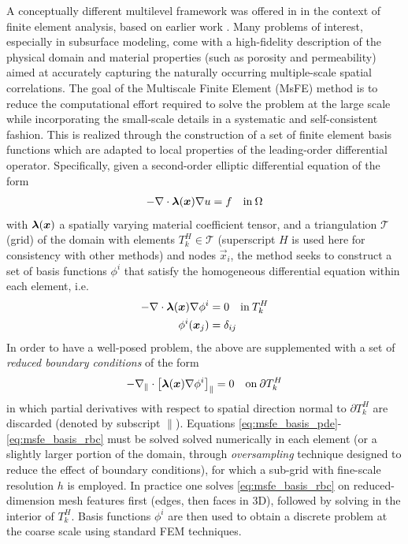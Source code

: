 A conceptually different multilevel framework was offered in \cite{Hou1997} in the context of finite element analysis, based on earlier work \cite{Babuska1983,Babuska1994}.   Many problems of interest, especially in subsurface modeling, come with a high-fidelity description of the physical domain and material properties (such as porosity and permeability) aimed at accurately capturing the naturally occurring multiple-scale spatial correlations.   The goal of the Multiscale Finite Element (MsFE) method is to reduce the computational effort required to solve the problem at the large scale while incorporating the small-scale details in a systematic and self-consistent fashion.   This is realized through the construction of a set of finite element basis functions which are adapted to local properties of the leading-order differential operator.   Specifically, given a second-order elliptic differential equation of the form
\begin{align}
    - \nabla \cdot \bm{\lambda}(\bm{x}) \nabla u = f \quad\text{in}\:\Omega
\end{align}
with $\bm{\lambda}(\bm{x})$ a spatially varying material coefficient tensor, and a triangulation $\mathcal{T}$ (grid) of the domain with elements $T_k^H \in \mathcal{T}$ (superscript $H$ is used here for consistency with other methods) and nodes $\vec{x}_i$, the method seeks to construct a set of basis functions $\phi^i$ that satisfy the homogeneous differential equation within each element, i.e.
\begin{align}
    - \nabla \cdot \bm{\lambda}(\bm{x}) \nabla \phi^i &= 0 \quad\text{in}\:T_k^H \label{eq:msfe_basis_pde}\\
    \phi^i(\bm{x}_j) &= \delta_{ij} \label{eq:msfe_basis_nodal_values}
\end{align}
In order to have a well-posed problem, the above are supplemented with a set of \textit{reduced boundary conditions} of the form
\begin{align}
    - \nabla_{\parallel} \cdot \left[\bm{\lambda}(\bm{x}) \nabla \phi^i\right]_{\parallel} = 0 \quad\text{on}\:\partial T_k^H \label{eq:msfe_basis_rbc}
\end{align}
in which partial derivatives with respect to spatial direction normal to $\partial T_k^H$ are discarded (denoted by subscript $\parallel$).   Equations \eqref{eq:msfe_basis_pde}-\eqref{eq:msfe_basis_rbc} must be solved solved numerically in each element (or a slightly larger portion of the domain, through \textit{oversampling} technique designed to reduce the effect of boundary conditions), for which a sub-grid with fine-scale resolution $h$ is employed.   In practice one solves \eqref{eq:msfe_basis_rbc} on reduced-dimension mesh features first (edges, then faces in 3D), followed by solving in the interior of $T_k^H$.   Basis functions $\phi^i$ are then used to obtain a discrete problem at the coarse scale using standard FEM techniques.   

